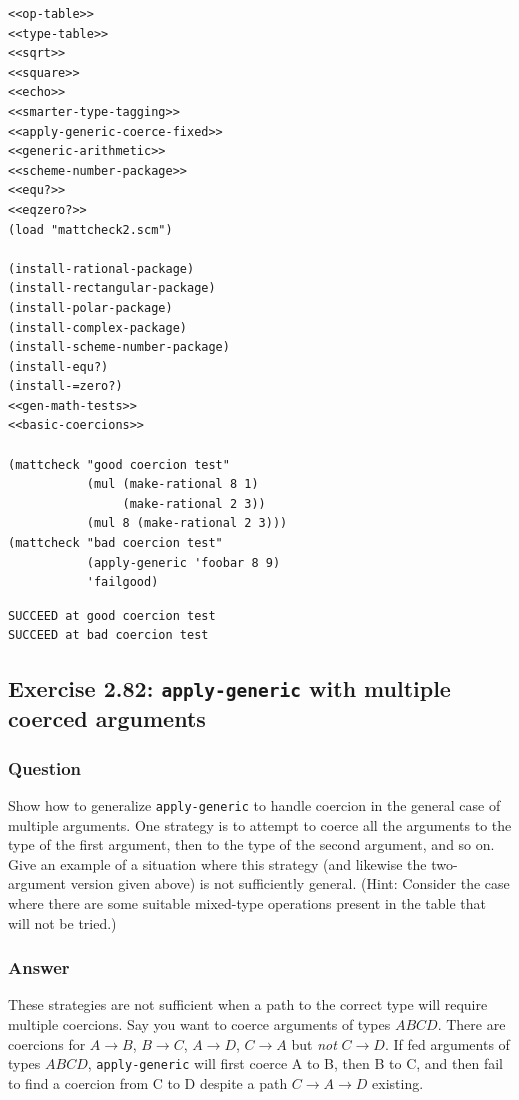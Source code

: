 \documentclass[final,fleqn,titlepage,twoside]{article}
\begin{document}
\begin{verbatim}
<<op-table>>
<<type-table>>
<<sqrt>>
<<square>>
<<echo>>
<<smarter-type-tagging>>
<<apply-generic-coerce-fixed>>
<<generic-arithmetic>>
<<scheme-number-package>>
<<equ?>>
<<eqzero?>>
(load "mattcheck2.scm")

(install-rational-package)
(install-rectangular-package)
(install-polar-package)
(install-complex-package)
(install-scheme-number-package)
(install-equ?)
(install-=zero?)
<<gen-math-tests>>
<<basic-coercions>>

(mattcheck "good coercion test"
           (mul (make-rational 8 1)
                (make-rational 2 3))
           (mul 8 (make-rational 2 3)))
(mattcheck "bad coercion test"
           (apply-generic 'foobar 8 9)
           'failgood)
\end{verbatim}

\begin{verbatim}
SUCCEED at good coercion test
SUCCEED at bad coercion test
\end{verbatim}

\subsection{Exercise 2.82: \texttt{apply-generic} with multiple coerced arguments}
\label{sec:org070872c}
\subsubsection{Question}
\label{sec:org5ea5098}
Show how to generalize \texttt{apply-generic} to handle coercion in the
general case of multiple arguments. One strategy is to attempt to coerce all the
arguments to the type of the first argument, then to the type of the second
argument, and so on. Give an example of a situation where this strategy (and
likewise the two-argument version given above) is not sufficiently general.
(Hint: Consider the case where there are some suitable mixed-type operations
present in the table that will not be tried.)

\subsubsection{Answer}
\label{sec:org872cbf5}
These strategies are not sufficient when a path to the correct type will require
multiple coercions. Say you want to coerce arguments of types \(ABCD\). There
are coercions for \(A \rightarrow B\), \(B \rightarrow C\), \(A \rightarrow
D\), \(C \rightarrow A\) but \emph{not} \(C \rightarrow D\). If fed arguments of
types \(ABCD\), \texttt{apply-generic} will first coerce A to B, then B to C, and
then fail to find a coercion from C to D despite a path \(C \rightarrow A
\rightarrow D\) existing.
\end{document}
